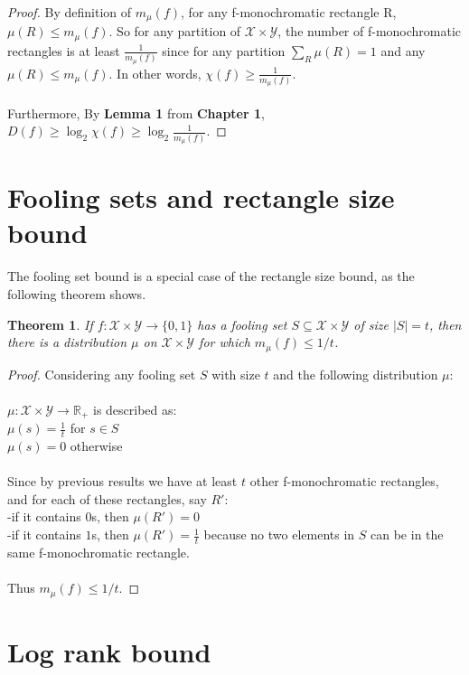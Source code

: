 \documentclass[11pt,oneside]{book}
\theoremstyle{plain}
\newtheorem{theorem}{Theorem}
\theoremstyle{definition}
\theoremstyle{plain}
\newcommand{\calX}{\mathcal{X}}
\newcommand{\calY}{\mathcal{Y}}
\begin{document}
\begin{proof}
	By definition of $m_\mu(f)$, for any f-monochromatic rectangle R, $\mu(R) \leq m_\mu(f)$. So for any partition of $\calX \times \calY$, the number of f-monochromatic rectangles is at least $\frac{1}{m_\mu(f)}$ since for any partition $\sum_{R} \mu(R) = 1$ and any $\mu(R) \leq m_\mu(f)$. In other words, $\chi(f) \ge \frac{1}{m_\mu(f)}$.\\
	\\
	Furthermore, By \textbf{Lemma 1} from \textbf{Chapter 1}, $D(f) \ge \log_2 \chi(f) \ge \log_2 \frac{1}{m_\mu(f)}$. 
\end{proof}


 \section{Fooling sets and rectangle size bound}

The fooling set bound is a special case of the rectangle size bound, as the following theorem shows.

\begin{theorem}
	If $f : \calX \times \calY \to \{0,1\}$ has a fooling set $S \subseteq \calX \times \calY$ of size $|S| = t$, then there is a distribution $\mu$ on $\calX \times \calY$ for which $m_\mu(f) \le 1/t$.
\end{theorem}

\begin{proof}
	Considering any fooling set $S$ with size $t$ and the following distribution $\mu$:\\
	 \\
	$\mu:\calX\times\calY \rightarrow \mathbb{R}_+$ is described as:\\
	$\mu(s)=\frac1t$   for $s\in S$\\
	$\mu(s)=0$ otherwise\\
	 \\
	Since by previous results we have at least $t$ other f-monochromatic rectangles, and for each of these rectangles, say $R'$:\\
	-if it contains $0$s, then $\mu(R')=0$\\
	-if it contains $1$s, then $\mu(R')=\frac1t$ because no two elements in $S$ can be in the same f-monochromatic rectangle.\\
	 \\
	Thus $m_\mu(f) \le 1/t$.
\end{proof}


 \section{Log rank bound}
\end{document}
